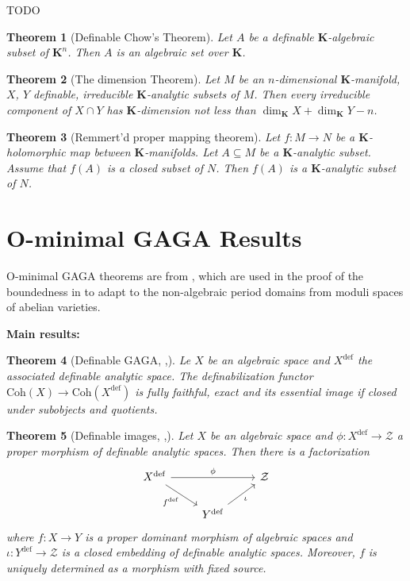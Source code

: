 \documentclass{amsart}
\newtheorem{theorem}{Theorem}[subsection]
\theoremstyle{definition}
\numberwithin{equation}{section}
\newcommand{\definable}{\mathrm{def}}
\begin{document}
TODO

\begin{theorem}[Definable Chow's Theorem]
  Let $A$ be a definable $\mathbf{K}$-algebraic subset of $\mathbf{K}^n$.
  Then $A$ is an algebraic set over $\mathbf{K}$.
\end{theorem}

\begin{theorem}[The dimension Theorem]
  Let $M$ be an $n$-dimensional $\mathbf{K}$-manifold,
  $X$, $Y$ definable, irreducible $\mathbf{K}$-analytic subsets of $M$.
  Then every irreducible component of $X \cap Y$ has $\mathbf{K}$-dimension not less than $\dim_{\mathbf{K}}X + \dim_{\mathbf{K}}Y - n$.
\end{theorem}

\begin{theorem}[Remmert'd proper mapping theorem]
  Let $f: M \to N$ be a $\mathbf{K}$-holomorphic map between $\mathbf{K}$-manifolds.
  Let $A \subseteq M$ be a $\mathbf{K}$-analytic subset.
  Assume that $f(A)$ is a closed subset of $N$.
  Then $f(A)$ is a $\mathbf{K}$-analytic subset of $N$.
\end{theorem}

\section{O-minimal GAGA Results}
O-minimal GAGA theorems are from \cite{zbMATH07662555},
which are used in the proof of the boundedness in \cite{arXiv:2507.00973,arXiv:2508.19215}
to adapt to the non-algebraic period domains from moduli spaces of abelian varieties.

\vspace{1em}

{\noindent\Large\bfseries Main results:}

\begin{theorem}[{Definable GAGA, \cite[Theorem 2.1]{arXiv:2508.19215},\cite[Theorem 1.4]{zbMATH07662555}}]
    Le $X$ be an algebraic space and $X^{\definable}$ the associated definable analytic space.
    The definabilization functor $\mathrm{Coh}(X) \to \mathrm{Coh}(X^{\definable})$ is fully faithful, exact and 
    its essential image if closed under subobjects and quotients.
\end{theorem}

\begin{theorem}[{Definable images, \cite[Theorem 2.2]{arXiv:2508.19215},\cite[Theorem 1.3]{zbMATH07662555}}]
    \label{def image}
    Let $X$ be an algebraic space and 
    $\phi: X^{\definable} \to \mathcal{Z}$ a proper morphism of definable analytic spaces.
    Then there is a factorization
    \[\begin{tikzcd}
    X^{\definable}\ar[rr,"\phi"]\ar[dr,"f^{\definable}"'] & & \mathcal{Z} \\
    & Y^{\definable}\ar[ur,"\iota"'] &
    \end{tikzcd}\]
    where $f: X\to Y$ is a proper dominant morphism of algebraic spaces and
    $\iota: Y^{\definable} \to \mathcal{Z}$ is a closed embedding of definable analytic spaces.
    Moreover, $f$ is uniquely determined as a morphism with fixed source.
\end{theorem}
\end{document}

